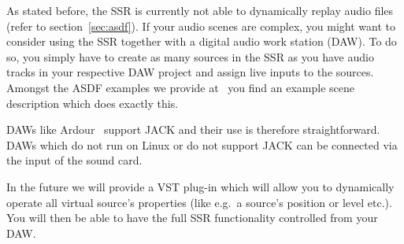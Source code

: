 As stated before, the SSR is currently not able to dynamically replay audio
files (refer to section~\ref{sec:asdf}). If your audio scenes are complex, you
might want to consider using the SSR together with a digital audio work station
(DAW). To do so, you simply have to create as many sources in the SSR as you
have audio tracks in your respective DAW project and assign live inputs to the
sources. Amongst the ASDF examples we provide at~\cite{ssr} you find an example
scene description which does exactly this.

DAWs like Ardour~\cite{ardour} support JACK and their use is therefore straightforward. DAWs which do not run on Linux or do not support JACK can be connected
via the input of the sound card.

In the future we will provide a VST plug-in which will allow you to dynamically
operate all virtual source's properties (like e.g.~a source's position or level
etc.). You will then be able to have the full SSR functionality controlled from your
DAW.
